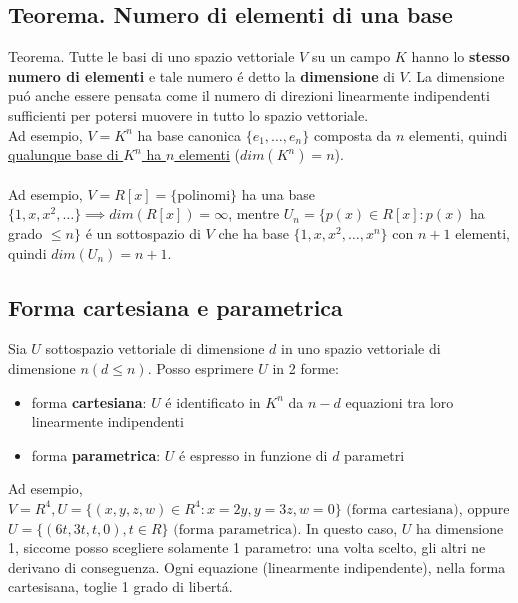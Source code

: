 \documentclass{article}
\begin{document}
\subsection{Teorema. Numero di elementi di una base}
Teorema. Tutte le basi di uno spazio vettoriale $V$ su un campo $K$ hanno lo \textbf{stesso numero di elementi} e tale numero é detto la \textbf{dimensione} di $V$. La dimensione puó anche essere pensata come il numero di direzioni linearmente indipendenti sufficienti per potersi muovere in tutto lo spazio vettoriale.\\
Ad esempio, $V = K^n$ ha base canonica $\{e_1, \dots, e_n\}$ composta da $n$ elementi, quindi \underline{qualunque base di $K^n$ ha $n$ elementi} ($dim(K^n) = n$).\\\\
Ad esempio, $V = R[x] = \{\mbox{polinomi}\}$ ha una base $\{1,x,x^2,\dots\} \implies dim(R[x]) = \infty$, mentre $U_n = \{p(x) \in R[x] : p(x)$ ha grado $\le n\}$ é un sottospazio di $V$ che ha base $\{1,x,x^2,\dots,x^n\}$ con $n+1$ elementi, quindi $dim(U_n) = n+1$.

\subsection{Forma cartesiana e parametrica}
Sia $U$ sottospazio vettoriale di dimensione $d$ in uno spazio vettoriale di dimensione $n (d \le n)$. Posso esprimere $U$ in 2 forme:
\begin{itemize}
	\item forma \textbf{cartesiana}: $U$ é identificato in $K^n$ da $n - d$ equazioni tra loro linearmente indipendenti
	\item forma \textbf{parametrica}: $U$ é espresso in funzione di $d$ parametri
\end{itemize} 
Ad esempio, $V = R^4, U = \{(x,y,z,w) \in R^4 : x = 2y, y = 3z, w = 0\} \mbox{ (forma cartesiana)}$, oppure $U = \{(6t,3t,t,0), t \in R\} \mbox{ (forma parametrica)}$. In questo caso, $U$ ha dimensione 1, siccome posso scegliere solamente 1 parametro: una volta scelto, gli altri ne derivano di conseguenza. Ogni equazione (linearmente indipendente), nella forma cartesisana, toglie 1 grado di libertá.\\\\
\end{document}
